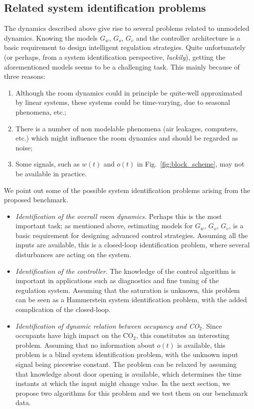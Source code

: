 \documentclass{article}
\begin{document}
\subsection{Related system identification problems}
The dynamics described above give rise to several problems related to unmodeled
dynamics. Knowing the models $G_w$, $G_o$, $G_v$ and the controller
architecture is a basic requirement to design intelligent regulation
strategies. Quite unfortunately (or perhaps, from a system identification
perspective, \emph{luckily}), getting the aforementioned models seems to be a
challenging task. This mainly because of three reasons:
\begin{enumerate}
\item Although the room dynamics could in principle be quite-well approximated by linear systems, these systems could be time-varying, due to seasonal phenomena, etc.;
\item There is a number of non modelable phenomena (air leakages, computers, etc.) which might influence the room dynamics and should be regarded as noise;
\item Some signals, such as $w(t)$ and $o(t)$ in
  Fig.~\ref{fig:block_scheme}, may not be available in practice.
\end{enumerate}
We point out some of the possible system identification problems arising from
the proposed benchmark.
\begin{itemize}
\item \emph{Identification of the overall room dynamics.} Perhaps this is the
  most important task; as mentioned above, estimating models for $G_w$, $G_o$,
  $G_v$, is a basic requirement for designing advanced control strategies.
  Assuming all the inputs are available, this is a closed-loop identification
  problem, where several disturbances are acting on the system.
\item \emph{Identification of the controller}. The knowledge of the control
  algorithm is important in applications such as diagnostics and fine tuning of
  the regulation system. Assuming that the saturation is unknown, this problem
  can be seen as a Hammerstein system identification problem, with the added
  complication of the closed-loop.
\item \emph{Identification of dynamic relation between occupancy and CO$_2$}.
  Since occupants have high impact on the CO$_2$, this constitutes an
  interesting problem. Assuming that no information about $o(t)$ is available,
  this problem is a blind system identification problem, with the unknown input
  signal being piecewise constant. The problem can be relaxed by assuming that
  knowledge about door opening is available, which determines the time instants
  at which the input might change value. In the next section, we propose two
  algorithms for this problem and we test them on our benchmark data.
\end{itemize}
\end{document}
